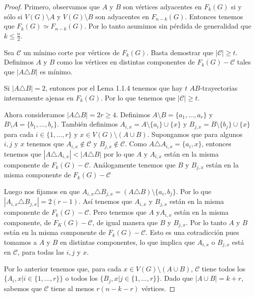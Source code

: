 \begin{proof}
Primero, observamos que $A$ y $B$ son v\'ertices adyacentes en $F_k(G)$ si y
s\'olo si $V(G) \setminus A$ y $V(G)\setminus B$ son adyacentes en $F_{n-k}(G)$.
Entonces tenemos que $F_k(G) \simeq F_{n-k}(G)$. Por lo tanto asumimos sin
p\'erdida de generalidad que $k \leq \frac{n}{2}$.

Sea $\mathcal{C}$ un m\'i{}nimo corte por v\'ertices de $F_k(G)$. Basta
demostrar que $|\mathcal{C}| \geq t$. Definimos $A$ y $B$ como los v\'ertices en
distintas componentes de $F_k(G)- \mathcal{C}$ tales que $|A \triangle B|$ es
m\'i{}nimo.

Si $|A \triangle B| = 2$, entonces por el Lema 1.1.4 tenemos que hay $t$
$AB$-trayectorias internamente ajenas en $F_k(G)$. Por lo que tenemos que
$|\mathcal{C}| \geq t$.

Ahora consideramos $|A \triangle B| = 2r \geq 4$. Definimos $A \setminus B
=\{a_1, \dots, a_r\}$ y $B \setminus A =\{b_1, \dots, b_r\}$. Tambi\'en
definimos $A_{i,x} = A\setminus \{a_i\} \cup \{x\}$ y $B_{j,x} = B\setminus
\{b_j\} \cup \{x\}$ para cada $i \in \{1, \dots, r\}$ y $x \in V(G)\setminus
(A\cup B)$. Supongamos que para algunos $i, j$ y $x$ tenemos que $A_{i,x} \notin
\mathcal{C}$ y $B_{j,x} \notin \mathcal{C}$. Como $A \triangle A_{i,x} = \{a_i,
x\}$, entonces tenemos que $|A \triangle A_{i,x}|< |A \triangle B|$ por lo que
$A$ y $A_{i,x}$ est\'an en la misma componente de $F_k(G)- \mathcal{C}$.
An\'alogamente tenemos que  $B$ y $B_{j,x}$ est\'an en la misma componente de
$F_k(G)-\mathcal{C}$

Luego nos fijamos en que $A_{i,x} \triangle B_{j,x} = (A \triangle B) \setminus
\{a_i, b_j\}$. Por lo que $|A_{i,x} \triangle B_{j,x}| = 2(r-1)$. As\'i{}
tenemos que $A_{i,x}$ y $B_{j,x}$ est\'an en la misma componente de $F_k(G)-
\mathcal{C}$. Pero tenemos que $A$ y$A_{i,x}$ est\'an en la misma componente, de
$F_K(G) - \mathcal{C}$, de igual manera que $B$ y $B_{j,x}$. Por lo tanto $A$ y
$B$ est\'an en la misma componente de $F_k(G)- \mathcal{C}$. Esto es una
cotradicci\'on pues tomamos a $A$ y $B$ en distintas componentes, lo que implica
que $A_{i,x}$ o $B_{j,x}$ est\'a en $\mathcal{C}$, para todas las $i,j$ y $x$.

Por lo anterior tenemos que, para cada $x \in V(G)\setminus (A \cup B)$,
$\mathcal{C}$ tiene todos los $\{A_i,x | i \in \{1, \dots, r\}\}$ o todos los
$\{B_j,x | j \in \{1, \dots, r\}\}$. Dado que $|A\cup B|=k +r$, sabemos que
$\mathcal{C}$ tiene al menos $r(n-k-r)$ v\'ertices.


\end{proof}
